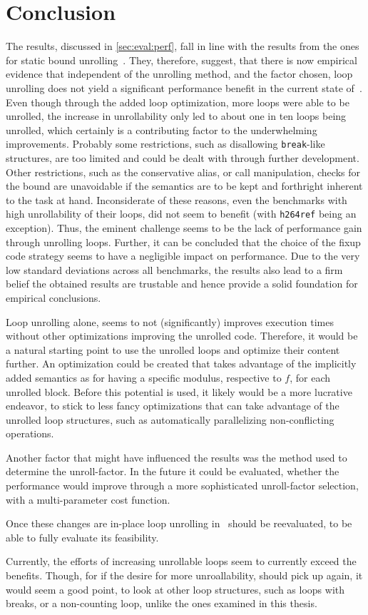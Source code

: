 \chapter{Conclusion}\label{sec:conclusion}

The results, discussed in \cref{sec:eval:perf}, fall in line with the results from the ones for static bound unrolling~\cite{aebi18bachelorarbeit}.
They, therefore, suggest, that there is now empirical evidence that independent of the unrolling method, and the factor chosen, loop unrolling does not yield a significant performance benefit in the current state of~\libFIRM.
Even though through the added loop optimization, more loops were able to be unrolled, the increase in unrollability only led to about one in ten loops being unrolled, which certainly is a contributing factor to the underwhelming improvements.
Probably some restrictions, such as disallowing \texttt{break}-like structures, are too limited and could be dealt with through further development.
Other restrictions, such as the conservative alias, or call manipulation, checks for the bound are unavoidable if the semantics are to be kept and forthright inherent to the task at hand.
Inconsiderate of these reasons, even the benchmarks with high unrollability of their loops, did not seem to benefit (with \texttt{h264ref} being an exception).
Thus, the eminent challenge seems to be the lack of performance gain through unrolling loops.
Further, it can be concluded that the choice of the fixup code strategy seems to have a negligible impact on performance.
Due to the very low standard deviations across all benchmarks, the results also lead to a firm belief the obtained results are trustable and hence provide a solid foundation for empirical conclusions.

Loop unrolling alone, seems to not (significantly) improves execution times without other optimizations improving the unrolled code.
Therefore, it would be a natural starting point to use the unrolled loops and optimize their content further.
An optimization could be created that takes advantage of the implicitly added semantics as for having a specific modulus, respective to $f$, for each unrolled block.
Before this potential is used, it likely would be a more lucrative endeavor, to stick to less fancy optimizations that can take advantage of the unrolled loop structures, such as automatically parallelizing non-conflicting operations.

Another factor that might have influenced the results was the method used to determine the unroll-factor.
In the future it could be evaluated, whether the performance would improve through a more sophisticated unroll-factor selection, with a multi-parameter cost function.

Once these changes are in-place loop unrolling in~\libFIRM{} should be reevaluated, to be able to fully evaluate its feasibility.

Currently, the efforts of increasing unrollable loops seem to currently exceed the benefits.
Though, for if the desire for more unroallability, should pick up again, it would seem a good point, to look at other loop structures, such as loops with breaks, or a non-counting loop, unlike the ones examined in this thesis.
